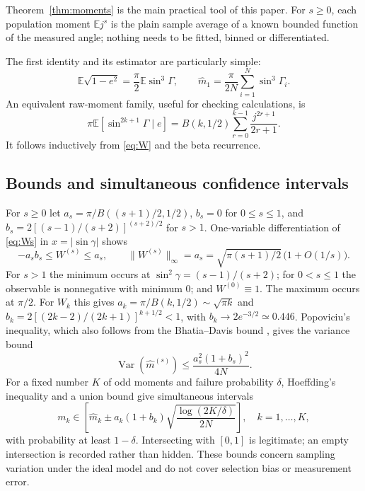 \documentclass[11pt,a4paper]{article}
\theoremstyle{remark}\newtheorem{remark}[theorem]{Remark}
\DeclareMathOperator{\Var}{Var}
\newcommand{\E}{\mathbb E}
\begin{document}
Theorem~\ref{thm:moments} is the main practical tool of this paper. For $s\ge0$, each population moment $\E j^s$ is the plain sample average of a known bounded function of the measured angle; nothing needs to be fitted, binned or differentiated.

The first identity and its estimator are particularly simple:
\begin{equation}\label{eq:firstmoment}
\boxed{\quad \E\sqrt{1-e^2}=\frac\pi2\E\sin^3\Gamma,
\qquad \widehat m_1=\frac{\pi}{2N}\sum_{i=1}^N\sin^3\Gamma_i.\quad}
\end{equation}
An equivalent raw-moment family, useful for checking calculations, is
\begin{equation}
\pi\E[\sin^{2k+1}\Gamma\mid e]
=B(k,1/2)\sum_{r=0}^{k-1}\frac{j^{2r+1}}{2r+1}.
\end{equation}
It follows inductively from \eqref{eq:W} and the beta recurrence.

\subsection{Bounds and simultaneous confidence intervals}

For $s\ge0$ let $a_s=\pi/B((s+1)/2,1/2)$, $b_s=0$ for $0\le s\le1$, and
$b_s=2[(s-1)/(s+2)]^{(s+2)/2}$ for $s>1$. One-variable differentiation of \eqref{eq:Ws} in $x=|\sin\gamma|$ shows
\begin{equation}
-a_sb_s\le W^{(s)}\le a_s,\qquad \|W^{(s)}\|_\infty=a_s=\sqrt{\pi(s+1)/2}\,\big(1+O(1/s)\big).
\end{equation}
For $s>1$ the minimum occurs at $\sin^2\gamma=(s-1)/(s+2)$; for $0<s\le1$ the observable is nonnegative with minimum $0$; and $W^{(0)}\equiv1$. The maximum occurs at $\pi/2$. For $W_k$ this gives $a_k=\pi/B(k,1/2)\sim\sqrt{\pi k}$ and $b_k=2[(2k-2)/(2k+1)]^{k+1/2}<1$, with $b_k\to2e^{-3/2}\simeq0.446$. Popoviciu's inequality, which also follows from the Bhatia--Davis bound \citep{BhatiaDavis2000}, gives the variance bound
\begin{equation}
\Var(\widehat m^{(s)})\le \frac{a_s^2(1+b_s)^2}{4N}.
\end{equation}
For a fixed number $K$ of odd moments and failure probability $\delta$, Hoeffding's inequality \citep{Hoeffding1963} and a union bound give simultaneous intervals
\begin{equation}\label{eq:hoeffding}
m_k\in\left[\widehat m_k\pm
a_k(1+b_k)\sqrt{\frac{\log(2K/\delta)}{2N}}\right],
\quad k=1,\ldots,K,
\end{equation}
with probability at least $1-\delta$. Intersecting with $[0,1]$ is legitimate; an empty intersection is recorded rather than hidden. These bounds concern sampling variation under the ideal model and do not cover selection bias or measurement error.
\end{document}

